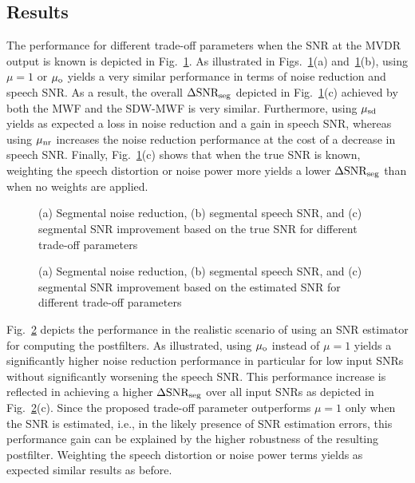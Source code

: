 \documentclass[10pt]{IEEEtran}
\begin{document}
\subsection{Results}
The performance for different trade-off parameters when the SNR at the MVDR output is known is depicted in Fig.~\ref{fig: perfect}.
As illustrated in Figs.~\ref{fig: perfect}(a) and~\ref{fig: perfect}(b), using $\mu=1$ or $\mu_{\rm o}$ yields a very similar performance in terms of noise reduction and speech SNR. 
As a result, the overall $\Delta \text{SNR}_{\rm seg}$ depicted in Fig.~\ref{fig: perfect}(c) achieved by both the MWF and the SDW-MWF is very similar.
Furthermore, using $\mu_{\rm sd}$ yields as expected a loss in noise reduction and a gain in speech SNR, whereas using $\mu_{\rm nr}$ increases the noise reduction performance at the cost of a decrease in speech SNR.
Finally, Fig.~\ref{fig: perfect}(c) shows that when the true SNR is known, weighting the speech distortion or noise power more yields a lower $\Delta \text{SNR}_{\rm seg}$ than when no weights are applied. \newline
\begin{figure}[t]
\centering

\caption{(a) Segmental noise reduction, (b) segmental speech SNR, and (c) segmental SNR improvement based on the true SNR for different trade-off parameters}
\label{fig: perfect}
\end{figure}
\begin{figure}[t]
\centering

\caption{(a) Segmental noise reduction, (b) segmental speech SNR, and (c) segmental SNR improvement based on the estimated SNR for different trade-off parameters}
\label{fig: estimated}
\end{figure}
Fig.~\ref{fig: estimated} depicts the performance in the realistic scenario of using an SNR estimator for computing the postfilters. 
As illustrated, using $\mu_{\rm o}$ instead of $\mu = 1$ yields a significantly higher noise reduction performance in particular for low input SNRs without significantly worsening the speech SNR. 
This performance increase is reflected in achieving a higher $\Delta \text{SNR}_{\rm seg}$ over all input SNRs as depicted in Fig.~\ref{fig: estimated}(c).
Since the proposed trade-off parameter outperforms $\mu = 1$ only when the SNR is estimated, i.e., in the likely presence of SNR estimation errors, this performance gain can be explained by the higher robustness of the resulting postfilter.  \newline
Weighting the speech distortion or noise power terms yields as expected similar results as before.
\end{document}
